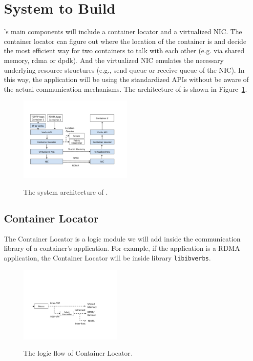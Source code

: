\section{System to Build} \label{sec:promise}

\Name's main components will include a container locator and a virtualized NIC.
The container locator can figure out where the location of the container is and
decide the most efficient way for two containers to talk with each other (e.g. 
via shared memory, rdma or dpdk).
And the virtualized NIC emulates the necessary underlying resource structures 
(e.g., send queue or receive queue of the NIC). In this way, the application will
be using the standardized APIs without be aware of the actual communication
mechanisms. The architecture of \Name is shown in Figure~\ref{fig:system_modules}.

     \begin{figure}[ht]
     \centering 
     \includegraphics[width=0.5\textwidth]{figures/system/system_modules.pdf}      
     \label{fig:system_modules}
     \caption{The system architecture of \Name.} 
     \end{figure}

\subsection{Container Locator}
The Container Locator is a logic module we will add inside the communication
library of a container's application. For example, if the application is a RDMA application,
the Container Locator will be inside library \texttt{libibverbs}. 

     \begin{figure}[ht]
     \centering 
     \includegraphics[width=0.45\textwidth]{figures/system/system_locator.pdf}      
     \label{fig:system_locator}
     \caption{The logic flow of Container Locator.} 
     \end{figure}


